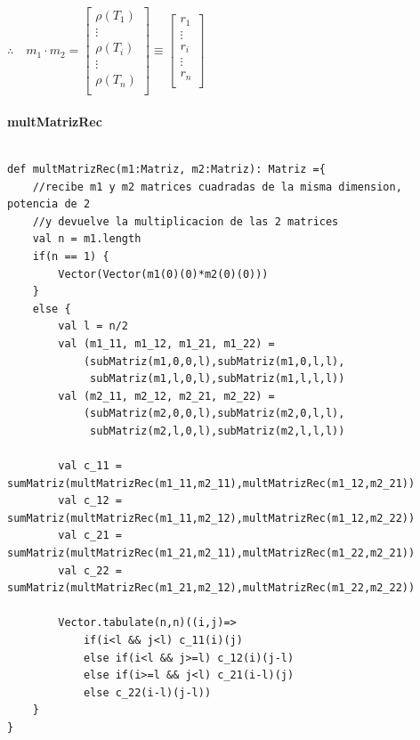 \documentclass[12pt, a4paper]{article}
\begin{document}
$\therefore~~~$ \begin{math}
 m_1 \cdot m_2 = \begin{bmatrix}
        \rho(T_1) \\
        \vdots \\
        \rho(T_i) \\
        \vdots \\
        \rho(T_n) 
         \\
     \end{bmatrix} \equiv
    \begin{bmatrix}
        r_1 \\
        \vdots \\
        r_i \\
        \vdots \\
        r_n 
         \\
     \end{bmatrix}
 \end{math} \\ \\
\textbf{{multMatrizRec}} \\ \\
\begin{lstlisting}[caption=mult matriz recursiva, label=lst:scala_code8]
def multMatrizRec(m1:Matriz, m2:Matriz): Matriz ={
    //recibe m1 y m2 matrices cuadradas de la misma dimension, potencia de 2
    //y devuelve la multiplicacion de las 2 matrices
    val n = m1.length
    if(n == 1) {
        Vector(Vector(m1(0)(0)*m2(0)(0)))
    }
    else {
        val l = n/2
        val (m1_11, m1_12, m1_21, m1_22) = 
            (subMatriz(m1,0,0,l),subMatriz(m1,0,l,l),
             subMatriz(m1,l,0,l),subMatriz(m1,l,l,l))
        val (m2_11, m2_12, m2_21, m2_22) =
            (subMatriz(m2,0,0,l),subMatriz(m2,0,l,l),
             subMatriz(m2,l,0,l),subMatriz(m2,l,l,l))

        val c_11 = sumMatriz(multMatrizRec(m1_11,m2_11),multMatrizRec(m1_12,m2_21))
        val c_12 = sumMatriz(multMatrizRec(m1_11,m2_12),multMatrizRec(m1_12,m2_22))
        val c_21 = sumMatriz(multMatrizRec(m1_21,m2_11),multMatrizRec(m1_22,m2_21))
        val c_22 = sumMatriz(multMatrizRec(m1_21,m2_12),multMatrizRec(m1_22,m2_22))

        Vector.tabulate(n,n)((i,j)=>
            if(i<l && j<l) c_11(i)(j)
            else if(i<l && j>=l) c_12(i)(j-l)
            else if(i>=l && j<l) c_21(i-l)(j)
            else c_22(i-l)(j-l))
    }
}
\end{lstlisting}
\end{document}
